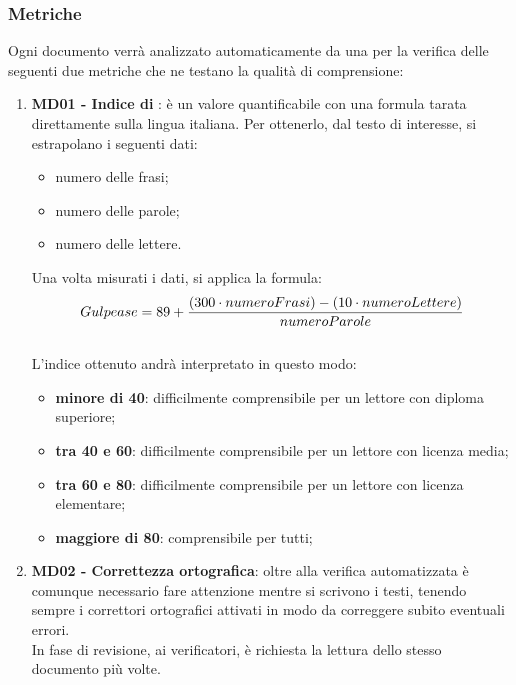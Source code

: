 	\subsubsection{Metriche}
	Ogni documento verrà analizzato automaticamente da una  per la verifica delle seguenti due metriche che ne testano la qualità di comprensione:
	\begin{enumerate}
		\item \textbf{MD01 - Indice di }: è un valore quantificabile con una formula tarata direttamente sulla lingua italiana. Per ottenerlo, dal testo di interesse, si estrapolano i seguenti dati:
		\begin{itemize}
			\item numero delle frasi;
			\item numero delle parole;
			\item numero delle lettere.
		\end{itemize}
		Una volta misurati i dati, si applica la formula:
		\begin{equation}\label{Formula per il calcolo dell'indice di Gulpease}
		Gulpease = 89 + {{(300 \cdot numeroFrasi)} - {(10 \cdot numeroLettere)} \over {numeroParole}}
		\end{equation}
		\\L'indice ottenuto andrà interpretato in questo modo:
		\begin{itemize}
			\item \textbf{minore di 40}: difficilmente comprensibile per un lettore con diploma superiore; 
			\item \textbf{tra 40 e 60}: difficilmente comprensibile per un lettore con licenza media;
			\item \textbf{tra 60 e 80}: difficilmente comprensibile per un lettore con licenza elementare;
			\item \textbf{maggiore di 80}: comprensibile per tutti;
		\end{itemize}
		\item \textbf{MD02 - Correttezza ortografica}: oltre alla verifica automatizzata è comunque necessario fare attenzione mentre si scrivono i testi, tenendo sempre i correttori ortografici attivati in modo da correggere subito eventuali errori.\\In fase di revisione, ai verificatori, è richiesta la lettura dello stesso documento più volte.
	\end{enumerate}